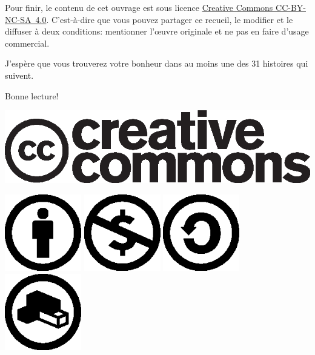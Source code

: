 \documentclass[a5paper,pagesize,10pt,bibliography=totoc,numbers=enddot,
headings=normal,DIV=9,twoside=false,tablecaptionabove]{scrbook}
\begin{document}
Pour finir, le contenu de cet ouvrage est sous licence \href{https://creativecommons.org/licenses/by-nc-sa/4.0/legalcode.fr}{Creative Commons CC-BY-NC-SA 4.0}. C'est-à-dire que vous pouvez partager ce recueil, le modifier et le diffuser à deux conditions: mentionner l'œuvre originale et ne pas en faire d'usage commercial.

J'espère que vous trouverez votre bonheur dans au moins une des 31 histoires qui suivent.

Bonne lecture!

\vfill
\hfill
\begin{minipage}{0.40\textwidth}
	\includegraphics[width=\textwidth]{images/cc.logo.eps}
\end{minipage}%
\hfill
\begin{minipage}{0.41\textwidth}
	\includegraphics[width=0.25\textwidth]{images/by.eps}%
	\includegraphics[width=0.25\textwidth]{images/nc.eps}%
	\includegraphics[width=0.25\textwidth]{images/sa.eps}%
	\includegraphics[width=0.25\textwidth]{images/remix.eps}%
\end{minipage}
\hfill
\endgroup
\end{document}
